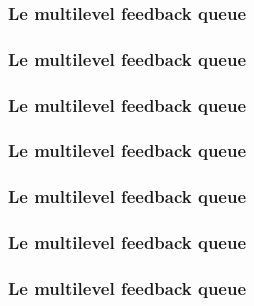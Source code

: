 
\begin{frame}
  \frametitle{Le multilevel feedback queue}

  \begin{center}
  \end{center}
\end{frame}


\begin{frame}
  \frametitle{Le multilevel feedback queue}

  \begin{center}
  \end{center}
\end{frame}


\begin{frame}
  \frametitle{Le multilevel feedback queue}

  \begin{center}
  \end{center}
\end{frame}


\begin{frame}
  \frametitle{Le multilevel feedback queue}

  \begin{center}
  \end{center}
\end{frame}


\begin{frame}
  \frametitle{Le multilevel feedback queue}

  \begin{center}
  \end{center}
\end{frame}


\begin{frame}
  \frametitle{Le multilevel feedback queue}

  \begin{center}
  \end{center}
\end{frame}


\begin{frame}
  \frametitle{Le multilevel feedback queue}

  \begin{center}
  \end{center}
\end{frame}

